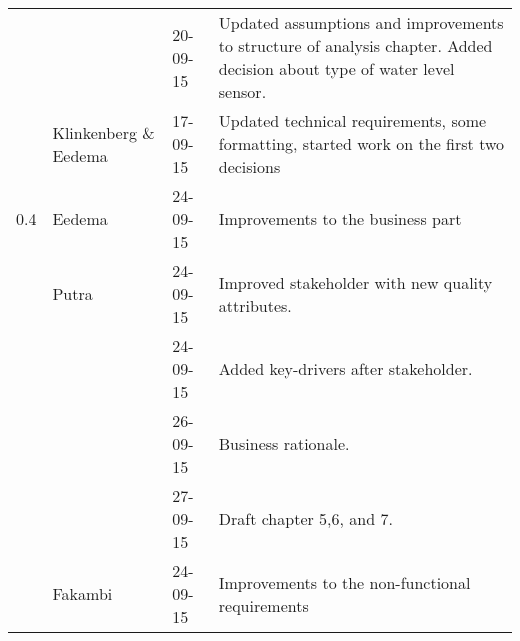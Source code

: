 \begin{longtable}{L{} L{} L{} L{}}
					 & 			             & 20-09-15      & Updated assumptions and improvements to structure of analysis chapter. Added decision about type of water level sensor.                                                                                                    \\
	                 & Klinkenberg \& Eedema & 17-09-15      & Updated technical requirements, some formatting, started work on the first two decisions                                                                                                                                   \\ 
	\midrule
			
	0.4              & Eedema                & 24-09-15      & Improvements to the business part                                                                                                                                                                                          \\
					 & Putra                 & 24-09-15      & Improved stakeholder with new quality attributes.                                                                                                                                                                          \\
	                 &                       & 24-09-15      & Added key-drivers after stakeholder.                                                                                                                                                                                       \\
	                 &                       & 26-09-15      & Business rationale.                                                                                                                                                                                                        \\
	                 &                       & 27-09-15      & Draft chapter 5,6, and 7.                                                                                                                                                                                                  \\
					 & Fakambi               & 24-09-15      & Improvements to the non-functional requirements                                                                                                                                                                            \\

\end{longtable}

